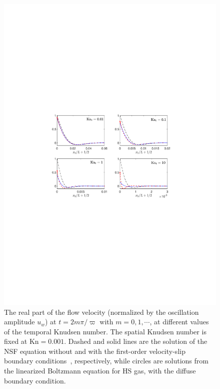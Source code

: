 \begin{figure}[t]
	\centering
	\includegraphics[width=0.8\columnwidth]{Introduction/IMG/Oscillatory_Couette_Route_NonEquilibrium.pdf}
	\caption{
		The real part of the flow velocity (normalized by the oscillation amplitude $u_w$) at $t=2m\pi/\varpi$ with $m=0,1,\cdots$, at different values of the temporal Knudsen number. The spatial Knudsen number is fixed at $\text{Kn}=0.001$. Dashed and solid lines are the solution of the NSF equation without and with the first-order velocity-slip boundary conditions~\cite{Sharipov2008Couette}, respectively, while circles are solutions from the linearized Boltzmann equation for HS gas, with the diffuse boundary condition. 
	}
	\label{Kn_t_region}
\end{figure}

